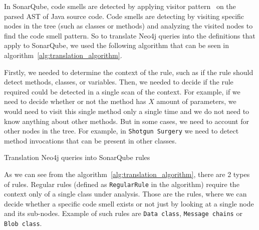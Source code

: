 In SonarQube, code smells are detected by applying visitor pattern~\cite{visitor_pattern} on the parsed
AST of Java source code.
Code smells are detecting by visiting specific nodes in the tree (such as classes or methods) and analyzing
the visited nodes to find the code smell pattern.
So to translate Neo4j queries into the definitions that apply to SonarQube, we used the following
algorithm that can be seen in algorithm~\ref{alg:translation_algorithm}.

Firstly, we needed to determine the context of the rule, such as if the rule should detect methods, classes, or variables.
Then, we needed to decide if the rule required could be detected in a single scan of the context.
For example, if we need to decide whether or not the method has $X$ amount of parameters, we would need to visit
this single method only a single time and we do not need to know anything about other methods.
But in some cases, we need to account for other nodes in the tree.
For example, in \verb|Shotgun Surgery| we need to detect method invocations that can be present in other classes.

\begin{algorithm} [!htb]
    \caption{Translation Neo4j queries into SonarQube rules}
    \label{alg:translation_algorithm}
    \BlankLine

\end{algorithm}

As we can see from the algorithm~\ref{alg:translation_algorithm}, there are 2 types of rules.
Regular rules (defined as \verb|RegularRule| in the algorithm) require the context only of a single class under analysis.
Those are the rules, where we can decide whether a specific code smell exists or not just by looking at a single node
and its sub-nodes.
Example of such rules are \verb|Data class|, \verb|Message chains| or \verb|Blob class|.

